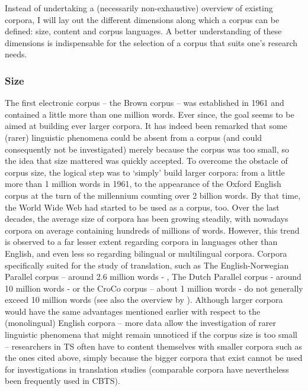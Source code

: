 Instead of undertaking a (necessarily non-exhaustive) overview of existing corpora, I will lay out the different dimensions along which a corpus can be defined: size, content and corpus languages. A better understanding of these dimensions is indispensable for the selection of a corpus that suits one’s research needs.

\subsubsection{Size}
\label{sec:2.2.1.1}  
The first electronic corpus – the Brown corpus – was established in 1961 and contained a little more than one million words. Ever since, the goal seems to be aimed at building ever larger corpora. It has indeed been remarked that some (rarer) linguistic phenomena could be absent from a corpus (and could consequently not be investigated) merely because the corpus was too small, so the idea that size mattered was quickly accepted. To overcome the obstacle of corpus size, the logical step was to ‘simply’ build larger corpora: from a little more than 1 million words in 1961, to the appearance of the Oxford English corpus at the turn of the millennium counting over 2 billion words. By that time, the World Wide Web had started to be used as a corpus, too. Over the last decades, the average size of corpora has been growing steadily, with nowadays corpora on average containing hundreds of millions of words. However, this trend is observed to a far lesser extent regarding corpora in languages other than English, and even less so regarding bilingual or multilingual corpora. Corpora specifically suited for the study of translation, such as The English-Norwegian Parallel corpus – around 2.6 million words - \citep{johansson_role_1998}, The Dutch Parallel corpus - around 10 million words - \citep{macken_dutch_2011} or the CroCo corpus – about 1 million words - \citep{hansen-schirra_towards_2012} do not generally exceed 10 million words (see also the overview by \citealt[26--27]{zanettin_corpus_2013}). Although larger corpora would have the same advantages mentioned earlier with respect to the (monolingual) English corpora – more data allow the investigation of rarer linguistic phenomena that might remain unnoticed if the corpus size is too small – researchers in TS often have to content themselves with smaller corpora such as the ones cited above, simply because the bigger corpora that exist cannot be used for investigations in translation studies (comparable corpora have nevertheless been frequently used in CBTS).

